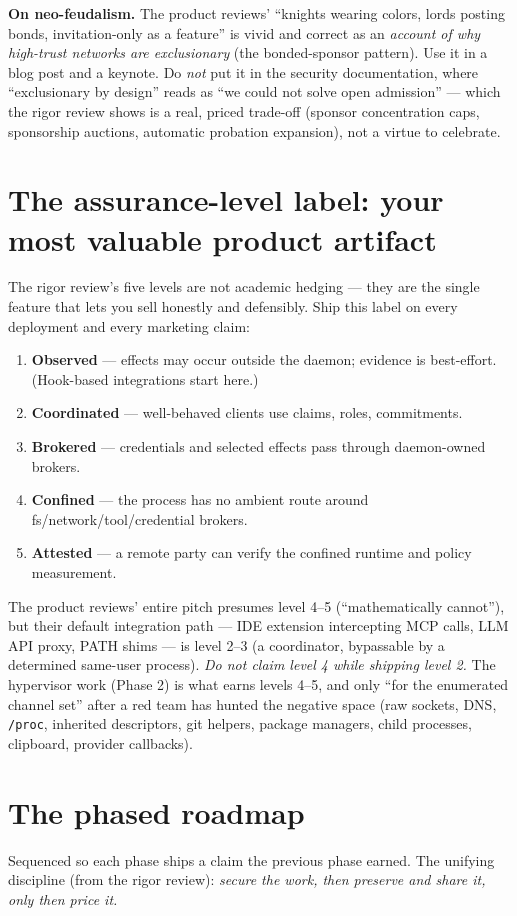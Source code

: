\documentclass[11pt,a4paper]{article}
\begin{document}
\noindent\textbf{On neo-feudalism.} The product reviews' ``knights wearing colors, lords posting bonds, invitation-only as a feature'' is vivid and correct as an \emph{account of why high-trust networks are exclusionary} (the bonded-sponsor pattern). Use it in a blog post and a keynote. Do \emph{not} put it in the security documentation, where ``exclusionary by design'' reads as ``we could not solve open admission'' --- which the rigor review shows is a real, priced trade-off (sponsor concentration caps, sponsorship auctions, automatic probation expansion), not a virtue to celebrate.

\section{The assurance-level label: your most valuable product artifact}
The rigor review's five levels are not academic hedging --- they are the single feature that lets you sell honestly and defensibly. Ship this label on every deployment and every marketing claim:
\begin{enumerate}[leftmargin=1.5em]
\item \textbf{Observed} --- effects may occur outside the daemon; evidence is best-effort. (Hook-based integrations start here.)
\item \textbf{Coordinated} --- well-behaved clients use claims, roles, commitments.
\item \textbf{Brokered} --- credentials and selected effects pass through daemon-owned brokers.
\item \textbf{Confined} --- the process has no ambient route around fs/network/tool/credential brokers.
\item \textbf{Attested} --- a remote party can verify the confined runtime and policy measurement.
\end{enumerate}
The product reviews' entire pitch presumes level 4--5 (``mathematically cannot''), but their default integration path --- IDE extension intercepting MCP calls, LLM API proxy, PATH shims --- is level 2--3 (a coordinator, bypassable by a determined same-user process). \emph{Do not claim level 4 while shipping level 2.} The hypervisor work (Phase 2) is what earns levels 4--5, and only ``for the enumerated channel set'' after a red team has hunted the negative space (raw sockets, DNS, \texttt{/proc}, inherited descriptors, git helpers, package managers, child processes, clipboard, provider callbacks).

\section{The phased roadmap}
Sequenced so each phase ships a claim the previous phase earned. The unifying discipline (from the rigor review): \emph{secure the work, then preserve and share it, only then price it.}
\end{document}
